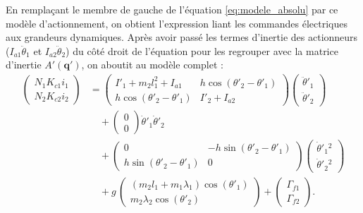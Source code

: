 \documentclass[10pt,a4paper,twocolumn]{article}
\begin{document}
En remplaçant le membre de gauche de l'équation \eqref{eq:modele_absolu} par ce modèle 
d'actionnement, on obtient l'expression liant les commandes électriques aux grandeurs 
dynamiques. Après avoir passé les termes d'inertie des actionneurs ($I_{a1}\ddot{\theta}_1$ 
et $I_{a2}\ddot{\theta}_2$) du côté droit de l'équation pour les regrouper avec la matrice 
d'inertie $A'(\mathbf{q}')$, on aboutit au modèle complet :
\begin{equation}
  \begin{aligned}
    \begin{pmatrix}
      N_1 K_{c1} i_1 \\
      N_2 K_{c2} i_2
    \end{pmatrix}
    &=
    \begin{pmatrix}
      I'_1 + m_2l_1^2 + I_{a1} & h\cos(\theta'_2-\theta'_1) \\
      h\cos(\theta'_2-\theta'_1) & I'_2 + I_{a2}
    \end{pmatrix}
    \begin{pmatrix}
      \ddot{\theta}'_1 \\
      \ddot{\theta}'_2
    \end{pmatrix}
    \\[0.5em]
    &\quad+
    \begin{pmatrix}
      0 \\
      0
    \end{pmatrix}
    \dot{\theta}'_1\dot{\theta}'_2
    \\[0.5em]
    &\quad+
    \begin{pmatrix}
      0 & -h\sin(\theta'_2-\theta'_1) \\
      h\sin(\theta'_2-\theta'_1) & 0
    \end{pmatrix}
    \begin{pmatrix}
      \dot{\theta}'_1{}^2\\
      \dot{\theta}'_2{}^2
    \end{pmatrix}
    \\[0.5em]
    &\quad+
    g\,
    \begin{pmatrix}
      (m_2l_1+m_1\lambda_1)\cos(\theta'_1) \\
      m_2\lambda_2\cos(\theta'_2)
    \end{pmatrix}
    +
    \begin{pmatrix}
      \Gamma_{f1} \\
      \Gamma_{f2}
    \end{pmatrix}.
  \end{aligned}
\label{eq:modele_complet_actionneurs}
\end{equation}
\end{document}
